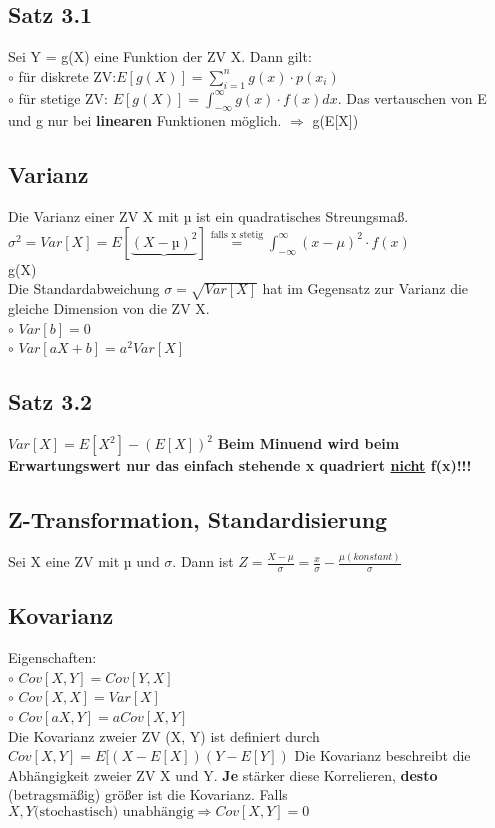 \subsection{Satz 3.1}
Sei Y = g(X) eine Funktion der ZV X. Dann gilt:\\
  $\circ$ für diskrete ZV:$E[g(X)] = \sum_{i=1}^{n} g(x) \cdot p(x_ {i})$\\
  $\circ$ für stetige ZV: $E[g(X)] = \int_{- \infty}^{\infty} g(x) \cdot f(x) dx$. Das vertauschen von E und g nur bei \textbf{linearen} Funktionen möglich. $\Rightarrow$ g(E[X])
\subsection{Varianz}
Die Varianz einer ZV X mit µ ist ein quadratisches Streungsmaß. $\sigma^2 = Var[X] = E[\underbrace{(X - µ)^2}] \stackrel{\text{falls x stetig}}{=} \int_{-\infty}^{\infty} (x-\mu)^2 \cdot f(x)$\\
g(X)\\
Die Standardabweichung $\sigma = \sqrt{Var[X]}$ hat im Gegensatz zur Varianz die gleiche Dimension von die ZV X.\\
  $\circ$ $Var[b] = 0$\\
  $\circ$ $Var[aX + b] = a^2 Var[X]$
\subsection{Satz 3.2}
$Var[X] = E[X^2] - (E[X])^2$ \textbf{Beim Minuend wird beim Erwartungswert nur das einfach stehende x quadriert \underline{nicht} f(x)!!!}
\subsection{Z-Transformation, Standardisierung}
Sei X eine ZV mit µ und $\sigma$. Dann ist $Z = \frac{X - \mu}{\sigma} = \frac{x}{\sigma} - \frac{\mu (konstant)}{\sigma}$ 
\subsection{Kovarianz}
Eigenschaften:\\
  $\circ$ $Cov[X, Y] = Cov[Y,X]$\\
  $\circ$ $Cov[X, X] = Var[X]$\\
  $\circ$ $Cov[aX, Y] = a Cov[X,Y]$\\
Die Kovarianz zweier ZV (X, Y) ist definiert durch
$Cov[X, Y] = E[(X - E[X])(Y-E[Y])$
Die Kovarianz beschreibt die Abhängigkeit zweier ZV X und Y. \textbf{Je} stärker diese Korrelieren, \textbf{desto} (betragsmäßig) größer ist die Kovarianz. Falls $X, Y \text{(stochastisch) unabhängig} \Rightarrow Cov[X, Y] = 0$ 
